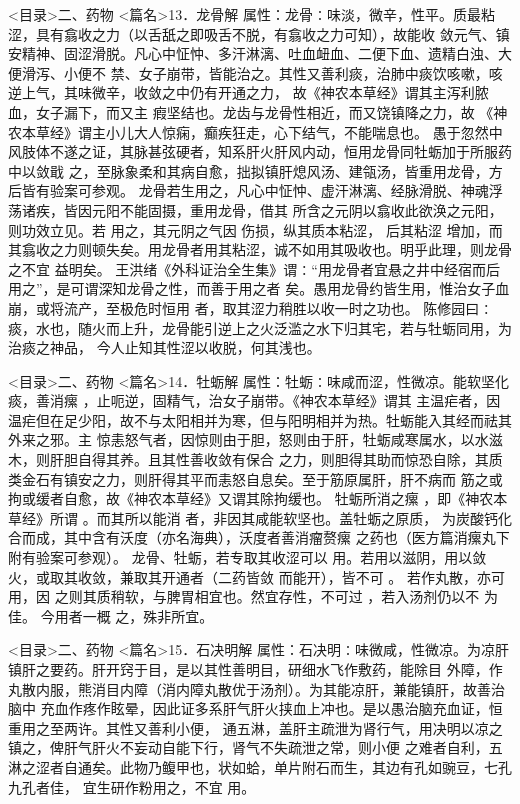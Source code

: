 \documentclass[a4paper,12pt,UTF8,twoside]{ctexbook}
\begin{document}
<目录>二、药物
<篇名>13．龙骨解
属性：龙骨∶味淡，微辛，性平。质最粘涩，具有翕收之力（以舌舐之即吸舌不脱，有翕收之力可知），故能收 
敛元气、镇安精神、固涩滑脱。凡心中怔忡、多汗淋漓、吐血衄血、二便下血、遗精白浊、大便滑泻、小便不 
禁、女子崩带，皆能治之。其性又善利痰，治肺中痰饮咳嗽，咳逆上气，其味微辛，收敛之中仍有开通之力， 
故《神农本草经》谓其主泻利脓血，女子漏下，而又主 瘕坚结也。龙齿与龙骨性相近，而又饶镇降之力，故 
《神农本草经》谓主小儿大人惊痫，癫疾狂走，心下结气，不能喘息也。 
愚于忽然中风肢体不遂之证，其脉甚弦硬者，知系肝火肝风内动，恒用龙骨同牡蛎加于所服药中以敛戢 
之，至脉象柔和其病自愈，拙拟镇肝熄风汤、建瓴汤，皆重用龙骨，方后皆有验案可参观。 
龙骨若生用之，凡心中怔忡、虚汗淋漓、经脉滑脱、神魂浮荡诸疾，皆因元阳不能固摄，重用龙骨，借其 
所含之元阴以翕收此欲涣之元阳，则功效立见。若 用之，其元阴之气因 伤损，纵其质本粘涩， 后其粘涩 
增加，而其翕收之力则顿失矣。用龙骨者用其粘涩，诚不如用其吸收也。明乎此理，则龙骨之不宜 益明矣。 
王洪绪《外科证治全生集》谓∶“用龙骨者宜悬之井中经宿而后用之”，是可谓深知龙骨之性，而善于用之者 
矣。愚用龙骨约皆生用，惟治女子血崩，或将流产，至极危时恒用 者，取其涩力稍胜以收一时之功也。 
陈修园曰∶痰，水也，随火而上升，龙骨能引逆上之火泛滥之水下归其宅，若与牡蛎同用，为治痰之神品， 
今人止知其性涩以收脱，何其浅也。 

<目录>二、药物
<篇名>14．牡蛎解
属性：牡蛎∶味咸而涩，性微凉。能软坚化痰，善消瘰 ，止呃逆，固精气，治女子崩带。《神农本草经》谓其 
主温疟者，因温疟但在足少阳，故不与太阳相并为寒，但与阳明相并为热。牡蛎能入其经而祛其外来之邪。主 
惊恚怒气者，因惊则由于胆，怒则由于肝，牡蛎咸寒属水，以水滋木，则肝胆自得其养。且其性善收敛有保合 
之力，则胆得其助而惊恐自除，其质类金石有镇安之力，则肝得其平而恚怒自息矣。至于筋原属肝，肝不病而 
筋之或拘或缓者自愈，故《神农本草经》又谓其除拘缓也。 
牡蛎所消之瘰 ，即《神农本草经》所谓 。而其所以能消 者，非因其咸能软坚也。盖牡蛎之原质， 
为炭酸钙化合而成，其中含有沃度（亦名海典），沃度者善消瘤赘瘰 之药也（医方篇消瘰丸下附有验案可参观）。 
龙骨、牡蛎，若专取其收涩可以 用。若用以滋阴，用以敛火，或取其收敛，兼取其开通者（二药皆敛 
而能开），皆不可 。 
若作丸散，亦可 用，因 之则其质稍软，与脾胃相宜也。然宜存性，不可过 ，若入汤剂仍以不 为佳。 
今用者一概 之，殊非所宜。 

<目录>二、药物
<篇名>15．石决明解
属性：石决明∶味微咸，性微凉。为凉肝镇肝之要药。肝开窍于目，是以其性善明目，研细水飞作敷药，能除目 
外障，作丸散内服，熊消目内障（消内障丸散优于汤剂）。为其能凉肝，兼能镇肝，故善治脑中 
充血作疼作眩晕，因此证多系肝气肝火挟血上冲也。是以愚治脑充血证，恒重用之至两许。其性又善利小便， 
通五淋，盖肝主疏泄为肾行气，用决明以凉之镇之，俾肝气肝火不妄动自能下行，肾气不失疏泄之常，则小便 
之难者自利，五淋之涩者自通矣。此物乃鳆甲也，状如蛤，单片附石而生，其边有孔如豌豆，七孔九孔者佳， 
宜生研作粉用之，不宜 用。 
\end{document}
